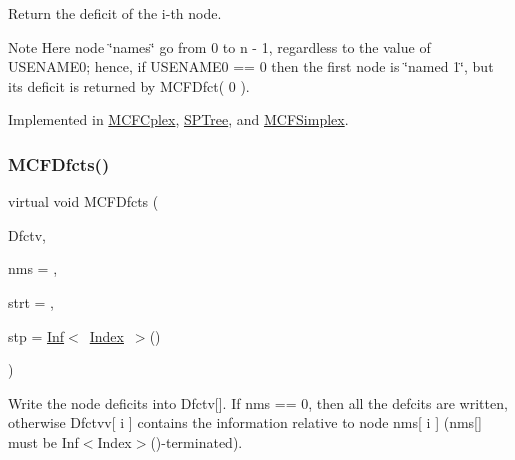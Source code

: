 Return the deficit of the i-\/th node.

\begin{DoxyNote}{Note}
Here node \char`\"{}names\char`\"{} go from 0 to n -\/ 1, regardless to the value of U\+S\+E\+N\+A\+M\+E0; hence, if U\+S\+E\+N\+A\+M\+E0 == 0 then the first node is \char`\"{}named 1\char`\"{}, but its deficit is returned by M\+C\+F\+Dfct( 0 ). 
\end{DoxyNote}


Implemented in \mbox{\hyperlink{class_m_c_f_cplex_ac6107cdac23180a7723ea0365d8f07a4}{M\+C\+F\+Cplex}}, \mbox{\hyperlink{class_s_p_tree_a160bbf78d4101054d9390b7e1a838eea}{S\+P\+Tree}}, and \mbox{\hyperlink{class_m_c_f_simplex_a160bbf78d4101054d9390b7e1a838eea}{M\+C\+F\+Simplex}}.

\mbox{\label{class_m_c_f_class_a99e2d376efc0d9552a62f9b71512b563}} 
\subsubsection{\texorpdfstring{M\+C\+F\+Dfcts()}{MCFDfcts()}\hspace{0.1cm}{\footnotesize\ttfamily [1/2]}}
{\footnotesize\ttfamily virtual void M\+C\+F\+Dfcts (\begin{DoxyParamCaption}\item[{\mbox{\hyperlink{class_m_c_f_class_a9dae1f1a39c208ce3c2b337cd5bb3d00}{F\+Row}}}]{Dfctv,  }\item[{\mbox{\hyperlink{class_m_c_f_class_a81575b2d4e4d5636b17170432150ae69}{c\+Index\+\_\+\+Set}}}]{nms = {},  }\item[{\mbox{\hyperlink{class_m_c_f_class_a76aaabb20535c51a2752b93f6c38fe54}{c\+Index}}}]{strt = {},  }\item[{\mbox{\hyperlink{class_m_c_f_class_ad53d6229d7ec28555a9c9c2fd9abf773}{Index}}}]{stp = {\ttfamily \mbox{\hyperlink{class_o_p_ttypes__di__unipi__it_1_1_inf}{Inf}}$<$~\mbox{\hyperlink{class_m_c_f_class_ad53d6229d7ec28555a9c9c2fd9abf773}{Index}}~$>$()} }\end{DoxyParamCaption})\hspace{0.3cm}{\ttfamily [pure virtual]}}

Write the node deficits into Dfctv\mbox{[}\mbox{]}. If nms == 0, then all the defcits are written, otherwise Dfctvv\mbox{[} i \mbox{]} contains the information relative to node nms\mbox{[} i \mbox{]} (nms\mbox{[}\mbox{]} must be Inf$<$\+Index$>$()-\/terminated).

